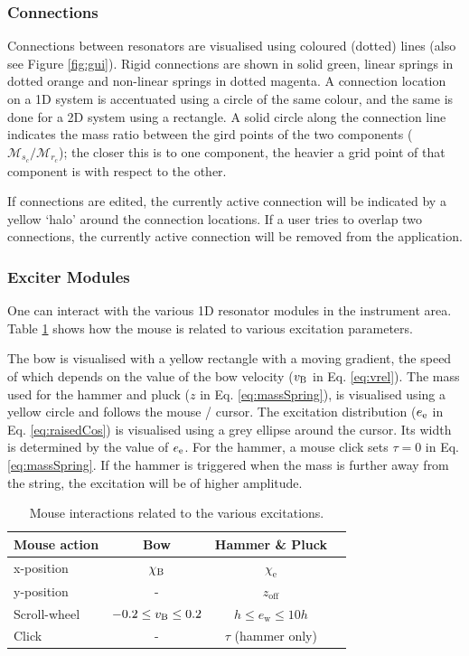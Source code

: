 \documentclass{article}
\begin{document}
\subsubsection{Connections}
Connections between resonators are visualised using coloured (dotted) lines (also see Figure \ref{fig:gui}). Rigid connections are shown in solid green, linear springs in dotted orange and non-linear springs in dotted magenta. A connection location on a 1D system is accentuated using a circle of the same colour, and the same is done for a 2D system using a rectangle. A solid circle along the connection line indicates the mass ratio between the gird points of the two components ($\mathcal{M}_{s_c} / \mathcal{M}_{r_c}$); the closer this is to one component, the heavier a grid point of that component is with respect to the other.  

If connections are edited, the currently active connection will be indicated by a yellow `halo' around the connection locations. If a user tries to overlap two connections, the currently active connection will be removed from the application.

\subsubsection{Exciter Modules}
One can interact with the various 1D resonator modules in the instrument area. Table \ref{tab:interactions} shows how the mouse is related to various excitation parameters.

The bow is visualised with a yellow rectangle with a moving gradient, the speed of which depends on the value of the bow velocity ($v_{\text{B}}$ in Eq. \eqref{eq:vrel}). The mass used for the hammer and pluck ($z$ in Eq. \eqref{eq:massSpring}), is visualised using a yellow circle and follows the mouse / cursor. The excitation distribution ($e_{\text{e}}$ in Eq. \eqref{eq:raisedCos}) is visualised using a grey ellipse around the cursor. Its width is determined by the value of $e_{\text{e}}$. For the hammer, a mouse click sets $\tau=0$ in Eq. \eqref{eq:massSpring}. If the hammer is triggered when the mass is further away from the string, the excitation will be of higher amplitude.

\begin{table}[h]\label{tab:interactions}
\begin{center}
\begin{tabular}{|l|c|c|c|}
    \hline
    Mouse action & Bow & Hammer \& Pluck\\ \hline
    x-position & $\chi_{\text{B}}$& $\chi_\text{e}$ \\
    y-position & - & $z_\text{off}$ \\
    Scroll-wheel & $-0.2\leq v_{\text{B}}\leq 0.2$ & $ h \leq e_\text{w} \leq 10 h$\\
    Click & - & $\tau$ (hammer only) \\\hline
\end{tabular}
\caption{Mouse interactions related to the various excitations.}
\end{center}
\end{table}
\end{document}

